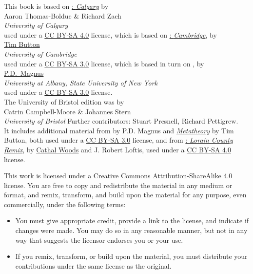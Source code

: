 \par



\newpage


\noindent
 \small This book is based on \href{https://github.com/rzach/forallx-yyc/}{\forallx: \emph{Calgary}} by\\[2ex] {Aaron Thomas-Bolduc \& Richard Zach}\\
 \emph{University of Calgary}
 \\[2ex]
used under a \href{https://creativecommons.org/licenses/by-sa/4.0/}{CC BY-SA 4.0} license, which is based on \href{http://people.ds.cam.ac.uk/tecb2/forallx.shtml}{\forallx:\emph{ Cambridge}}, by\\[2ex]
\href{http://people.ds.cam.ac.uk/tecb2/index.shtml}{Tim Button}\\
\emph{University of Cambridge}\\[2ex]
used under a \href{https://creativecommons.org/licenses/by-sa/3.0/}{CC BY-SA 3.0} license, which is based in turn on \href{https://www.fecundity.com/logic/}{\forallx}, by\\[2ex]
\href{https://www.fecundity.com/job/}{P.D.\ Magnus}\\
\emph{University at Albany, State University of New York}\\[2ex]
used under a \href{https://creativecommons.org/licenses/by-sa/3.0/}{CC BY-SA 3.0} license.
\\[3em]
The University of Bristol edition was  by 
\\[2ex] {Catrin Campbell-Moore \& Johannes Stern}\\\emph{University of Bristol}
Further contributors: Stuart Presnell, Richard Pettigrew.
\\[2ex]
It includes additional material from \forallx{} by P.D. Magnus
and \href{http://people.ds.cam.ac.uk/tecb2/metatheory.shtml}{\emph{Metatheory}} by Tim Button, both used under
a \href{https://creativecommons.org/licenses/by-sa/3.0/}{CC BY-SA 3.0}
license, and from \href{https://github.com/rob-helpy-chalk/openintroduction}{\forallx: \emph{Lorain County Remix}}, by \href{https://sites.google.com/site/cathalwoods/}{Cathal
Woods} and J. Robert Loftis, used under
a \href{https://creativecommons.org/licenses/by-sa/4.0/}{CC BY-SA 4.0}
license.

\bigskip

\noindent \footnotesize This work is licensed under a \href{https://creativecommons.org/licenses/by-sa/4.0/}{Creative Commons Attribution-ShareAlike 4.0} license. 
You are free to copy and redistribute the material in any medium or format, and  remix, transform, and build upon the material for any purpose, even commercially, under the following terms:
\begin{itemize}
\item You must give appropriate credit, provide a link to the license, and indicate if changes were made. You may do so in any reasonable manner, but not in any way that suggests the licensor endorses you or your use.
\item If you remix, transform, or build upon the material, you must distribute your contributions under the same license as the original.
\end{itemize}

